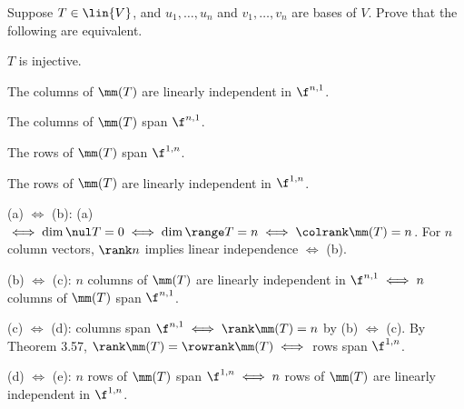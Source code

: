 \begin{exercise}[3c17]
    Suppose $T \in \lin{V}$, and $u_1, \ldots, u_n$ and $v_1, \ldots, v_n$ are bases of $V$. Prove that the following are equivalent.
    \begin{subexercises}
        \item $T$ is injective.
        \item The columns of $\mm(T)$ are linearly independent in $\f^{n, 1}$.
        \item The columns of $\mm(T)$ span $\f^{n, 1}$.
        \item The rows of $\mm(T)$ span $\f^{1, n}$.
        \item The rows of $\mm(T)$ are linearly independent in $\f^{1, n}$.
    \end{subexercises}
\end{exercise}

\begin{sole}
    \item (a) $\iff$ (b): (a) $\iff \dim \nul T = 0 \iff \dim \range T = n \iff \colrank \mm(T) = n$. For $n$ column vectors, $\rank n$ implies linear independence $\iff$ (b).
    \item (b) $\iff$ (c): $n$ columns of $\mm(T)$ are linearly independent in $\f^{n, 1} \iff n$ columns of $\mm(T)$ span $\f^{n, 1}$.
    \item (c) $\iff$ (d): columns span $\f^{n, 1} \iff \rank \mm(T) = n$ by (b) $\iff$ (c). By Theorem 3.57, $\rank \mm(T) = \rowrank \mm(T) \iff$ rows span $\f^{1, n}$.
    \item (d) $\iff$ (e): $n$ rows of $\mm(T)$ span $\f^{1, n} \iff n$ rows of $\mm(T)$ are linearly independent in $\f^{1, n}$.
\end{sole}